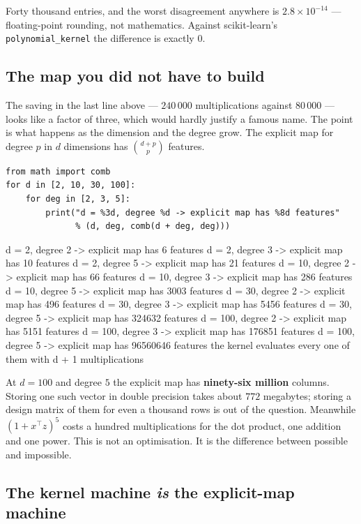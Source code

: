 \documentclass[11pt]{article}
\begin{document}
Forty thousand entries, and the worst disagreement anywhere is
$2.8\times10^{-14}$ --- floating-point rounding, not mathematics. Against
scikit-learn's \texttt{polynomial\_kernel} the difference is exactly $0$.

\subsection{The map you did not have to build}

The saving in the last line above --- $240\,000$ multiplications against
$80\,000$ --- looks like a factor of three, which would hardly justify a
famous name. The point is what happens as the dimension and the degree grow.
The explicit map for degree $p$ in $d$ dimensions has $\binom{d+p}{p}$
features.

\begin{lstlisting}
from math import comb
for d in [2, 10, 30, 100]:
    for deg in [2, 3, 5]:
        print("d = %3d, degree %d -> explicit map has %8d features"
              % (d, deg, comb(d + deg, deg)))
\end{lstlisting}
\begin{codeout}
d =   2, degree 2 -> explicit map has        6 features
d =   2, degree 3 -> explicit map has       10 features
d =   2, degree 5 -> explicit map has       21 features
d =  10, degree 2 -> explicit map has       66 features
d =  10, degree 3 -> explicit map has      286 features
d =  10, degree 5 -> explicit map has     3003 features
d =  30, degree 2 -> explicit map has      496 features
d =  30, degree 3 -> explicit map has     5456 features
d =  30, degree 5 -> explicit map has   324632 features
d = 100, degree 2 -> explicit map has     5151 features
d = 100, degree 3 -> explicit map has   176851 features
d = 100, degree 5 -> explicit map has 96560646 features
the kernel evaluates every one of them with d + 1 multiplications
\end{codeout}

At $d = 100$ and degree $5$ the explicit map has \textbf{ninety-six million}
columns. Storing one such vector in double precision takes about
$772$ megabytes; storing a design matrix of them for even a thousand rows is
out of the question. Meanwhile $(1 + x^\top z)^5$ costs a hundred
multiplications for the dot product, one addition and one power. This is not an
optimisation. It is the difference between possible and impossible.

\subsection{The kernel machine \emph{is} the explicit-map machine}
\end{document}
